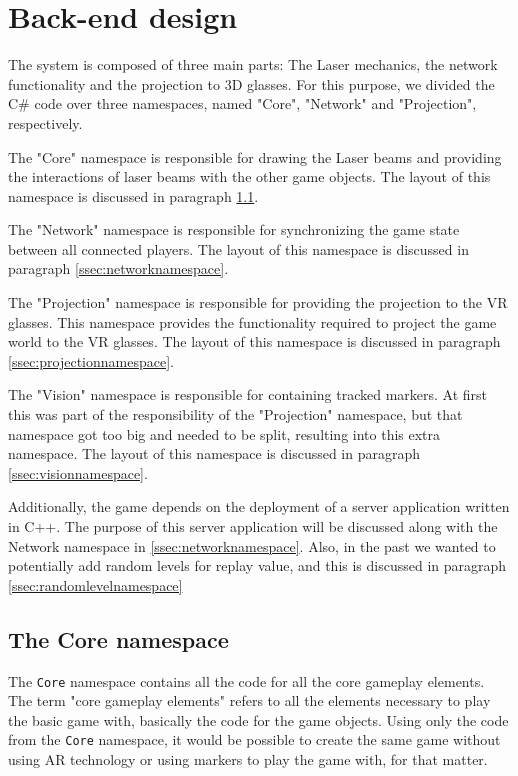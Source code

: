 	\section{Back-end design} \label{sec:backenddesign}
		The system is composed of three main parts: The Laser mechanics, the network
		functionality and the projection to 3D glasses. For this purpose, we divided
		the C\# code over three namespaces, named "Core", "Network" and
		"Projection", respectively.

		The "Core" namespace is responsible for drawing the Laser beams and
		providing the interactions of laser beams with the other game objects.
		The layout of this namespace is discussed in paragraph 
		\ref{ssec:corenamespace}.

		The "Network" namespace is responsible for synchronizing the game state
		between all connected players. The layout of this namespace is discussed 
		in paragraph \ref{ssec:networknamespace}.

		The "Projection" namespace is responsible for providing the projection to
		the VR glasses. This namespace provides the functionality required to project
		the game world to the VR glasses. The layout of this namespace is discussed in
		paragraph \ref{ssec:projectionnamespace}.
		
		The "Vision" namespace is responsible for containing tracked markers.
		At first this was part of the responsibility of the "Projection"
		namespace, but that namespace got too big and needed to be split,
		resulting into this extra namespace. The layout of this namespace is
		discussed in paragraph \ref{ssec:visionnamespace}.
		
		Additionally, the game depends on the deployment of a server application
		written in C++. The purpose of this server application will be discussed 
		along with the Network namespace in \ref{ssec:networknamespace}. Also,
		in the past we wanted to potentially add random levels for replay value,
		and this is discussed in paragraph \ref{ssec:randomlevelnamespace}
		
		\subsection{The Core namespace} \label{ssec:corenamespace}
			The \texttt{Core} namespace contains all the code for all the core gameplay
			elements. The term "core gameplay elements" refers to all the
			elements necessary to play the basic game with, basically the code
			for the game objects. Using only the code from the \texttt{Core} namespace,
			it would be possible to create the same game without using AR
			technology or using markers to play the game with, for that matter.
			
